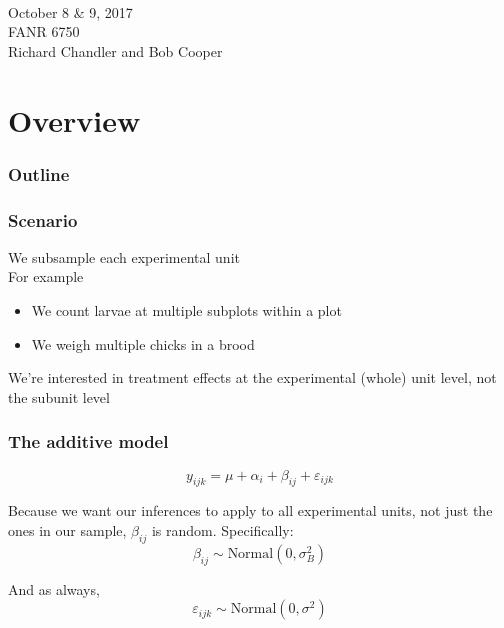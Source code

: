 \documentclass[color=usenames,dvipsnames]{beamer}\usepackage[]{graphicx}\usepackage[]{color}
\begin{document}



\begin{frame}[plain]
  \LARGE
  \centering \par
  {\color{RoyalBlue}{\bf Lab 8 -- Nested ANOVA}} \\
  \vspace{1cm}
  \Large
  October 8 \& 9, 2017 \\
  FANR 6750 \\
  \vfill
  \large
  Richard Chandler and Bob Cooper
\end{frame}







\section{Overview}



\begin{frame}
  \frametitle{Outline}
  \Large
\end{frame}




\begin{frame}
  \frametitle{Scenario}
  \large
  We subsample each experimental unit \\
  \pause
  \vfill
  For example
      \begin{itemize}
        \large
        \item We count larvae at multiple subplots within a plot
        \item We weigh multiple chicks in a brood
      \end{itemize}
  \pause
  \vfill
  We're interested in treatment effects at the experimental (whole) unit
  level, not the subunit level
\end{frame}




\begin{frame}
  \frametitle{The additive model}
  \large
\[
y_{ijk} = \mu + \alpha_i + \beta_{ij} + \varepsilon_{ijk}
\] \par
\vspace{1cm}
\pause
\large
Because we want our inferences to apply to all experimental units, not
just the ones in our sample, $\beta_{ij}$ is random.
\pause
\vfill
Specifically:
\[
\beta_{ij} \sim \mbox{Normal}(0, \sigma^2_B)
\]

\pause
\large
And as always,
\[
\varepsilon_{ijk} \sim \mbox{Normal}(0, \sigma^2)
\]
\end{frame}
\end{document}
